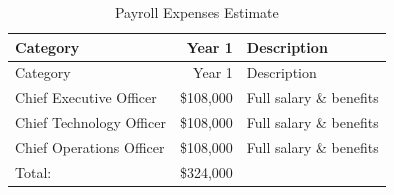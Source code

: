 \documentclass[11pt,openany]{book}
\begin{document}
\begin{longtable}[]{@{}lrl@{}}
\caption{Payroll Expenses Estimate}\tabularnewline
\toprule
\begin{minipage}[b]{0.34\columnwidth}\raggedright
Category\strut
\end{minipage} & \begin{minipage}[b]{0.16\columnwidth}\raggedleft
Year 1\strut
\end{minipage} & \begin{minipage}[b]{0.32\columnwidth}\raggedright
Description\strut
\end{minipage}\tabularnewline
\midrule
\endfirsthead
\toprule
\begin{minipage}[b]{0.34\columnwidth}\raggedright
Category\strut
\end{minipage} & \begin{minipage}[b]{0.16\columnwidth}\raggedleft
Year 1\strut
\end{minipage} & \begin{minipage}[b]{0.32\columnwidth}\raggedright
Description\strut
\end{minipage}\tabularnewline
\midrule
\endhead
\begin{minipage}[t]{0.34\columnwidth}\raggedright
Chief Executive Officer\strut
\end{minipage} & \begin{minipage}[t]{0.16\columnwidth}\raggedleft
\$108,000\strut
\end{minipage} & \begin{minipage}[t]{0.32\columnwidth}\raggedright
Full salary \& benefits\strut
\end{minipage}\tabularnewline
\begin{minipage}[t]{0.34\columnwidth}\raggedright
Chief Technology Officer\strut
\end{minipage} & \begin{minipage}[t]{0.16\columnwidth}\raggedleft
\$108,000\strut
\end{minipage} & \begin{minipage}[t]{0.32\columnwidth}\raggedright
Full salary \& benefits\strut
\end{minipage}\tabularnewline
\begin{minipage}[t]{0.34\columnwidth}\raggedright
Chief Operations Officer\strut
\end{minipage} & \begin{minipage}[t]{0.16\columnwidth}\raggedleft
\$108,000\strut
\end{minipage} & \begin{minipage}[t]{0.32\columnwidth}\raggedright
Full salary \& benefits\strut
\end{minipage}\tabularnewline
\begin{minipage}[t]{0.34\columnwidth}\raggedright
Total:\strut
\end{minipage} & \begin{minipage}[t]{0.16\columnwidth}\raggedleft
\$324,000\strut
\end{minipage} & \begin{minipage}[t]{0.32\columnwidth}\raggedright
\strut
\end{minipage}\tabularnewline
\bottomrule
\end{longtable}
\end{document}
